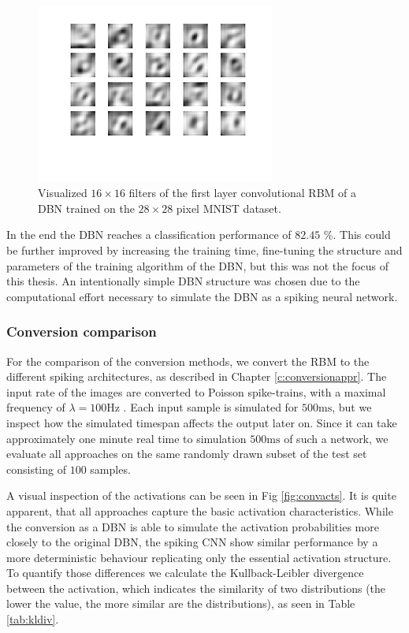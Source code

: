 \begin{figure}[h!]
	\centering
    	\includegraphics[width=0.7\textwidth]{imgs/weights_rbm.png} 
    \caption{Visualized $16 \times 16$ filters of the first layer convolutional RBM of a DBN trained on the $28 \times 28$ pixel MNIST dataset.}
	\label{fig:rbmw}
\end{figure}

In the end the DBN reaches a classification performance of $82.45$ \%. 
This could be further improved by increasing the training time, fine-tuning the structure and parameters of the training algorithm of the DBN, but this was not the focus of this thesis.
An intentionally simple DBN structure was chosen due to the computational effort necessary to simulate the DBN as a spiking neural network. 


\subsubsection{Conversion comparison} \label{c:conversioncomp}

For the comparison of the conversion methods, we convert the RBM to the different spiking architectures, as described in Chapter \ref{c:conversionappr}. 
The input rate of the images are converted to Poisson spike-trains, with a maximal frequency of $\lambda = 100 \text{Hz}$ .
Each input sample is simulated for $500 \text{ms}$, but we inspect how the simulated timespan affects the output later on.
Since it can take approximately one minute real time to simulation $500 \text{ms}$ of such a network, we evaluate all approaches on the same randomly drawn subset of the test set consisting of $100$ samples.

A visual inspection of the activations can be seen in Fig \ref{fig:convacts}. 
It is quite apparent, that all approaches capture the basic activation characteristics. 
While the conversion as a DBN is able to simulate the activation probabilities more closely to the original DBN, the spiking CNN show similar performance by a more deterministic behaviour replicating only the essential activation structure.
To quantify those differences we calculate the Kullback-Leibler divergence between the activation, which indicates the similarity of two distributions (the lower the value, the more similar are the distributions), as seen in Table \ref{tab:kldiv}.



